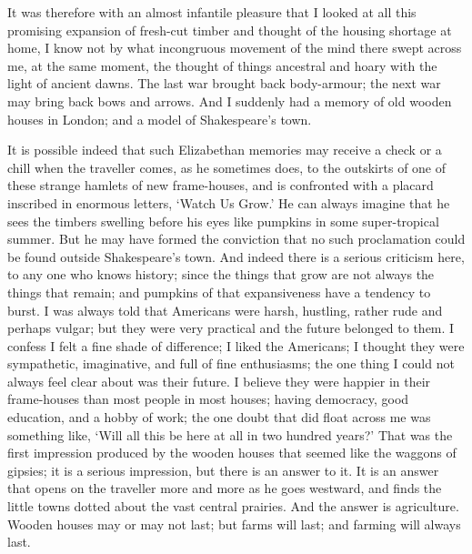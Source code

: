 \documentclass{book}
\begin{document}
It was therefore with an almost infantile pleasure that I looked at all this promising expansion of fresh-cut timber and thought of the housing shortage at home, I know not by what incongruous movement of the mind there swept across me, at the same moment, the thought of things ancestral and hoary with the light of ancient dawns. The last war brought back body-armour; the next war may bring back bows and arrows. And I suddenly had a memory of old wooden houses in London; and a model of Shakespeare’s town.

It is possible indeed that such Elizabethan memories may receive a check or a chill when the traveller comes, as he sometimes does, to the outskirts of one of these strange hamlets of new frame-houses, and is confronted with a placard inscribed in enormous letters, ‘Watch Us Grow.’ He can always imagine that he sees the timbers swelling before his eyes like pumpkins in some super-tropical summer. But he may have formed the conviction that no such proclamation could be found outside Shakespeare’s town. And indeed there is a serious criticism here, to any one who knows history; since the things that grow are not always the things that remain; and pumpkins of that expansiveness have a tendency to burst. I was always told that Americans were harsh, hustling, rather rude and perhaps vulgar; but they were very practical and the future belonged to them. I confess I felt a fine shade of difference; I liked the Americans; I thought they were sympathetic, imaginative, and full of fine enthusiasms; the one thing I could not always feel clear about was their future. I believe they were happier in their frame-houses than most people in most houses; having democracy, good education, and a hobby of work; the one doubt that did float across me was something like, ‘Will all this be here at all in two hundred years?’ That was the first impression produced by the wooden houses that seemed like the waggons of gipsies; it is a serious impression, but there is an answer to it. It is an answer that opens on the traveller more and more as he goes westward, and finds the little towns dotted about the vast central prairies. And the answer is agriculture. Wooden houses may or may not last; but farms will last; and farming will always last.
\end{document}
